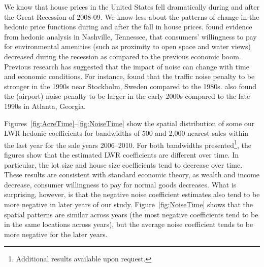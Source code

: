\documentclass{article}\usepackage{graphicx, color}
\begin{document}
We know that house prices in the United States fell dramatically during and after the Great Recession of 2008-09. We know less about the patterns of change in the hedonic price functions during and after the fall in house prices. \citet{Cho2011b} found evidence from hedonic analysis in Nashville, Tennessee, that consumers' willingness to pay for environmental amenities (such as proximity to open space and water views) decreased during the recession as compared to the previous economic boom. Previous research has suggested that the impact of noise can change with time and economic conditions. For instance, \citet{Wilhelmsson2000} found that the traffic noise penalty to be stronger in the 1990s near Stockholm, Sweden compared to the 1980s. \citet{Cohen2009} also found the (airport) noise penalty to be larger in the early 2000s compared to the late 1990s in Atlanta, Georgia. 

Figures~\ref{fig:AcreTime}--\ref{fig:NoiseTime} show the spatial distribution of some our LWR hedonic coefficients for bandwidths of 500 and 2,000 nearest sales within the last year for the sale years 2006--2010. For both bandwidths presented\footnote{Additional results available upon request.}, the figures show that the estimated LWR coefficients are different over time. In particular, the lot size and house size coefficients tend to decrease over time. These results are consistent with standard economic theory, as wealth and income decrease, consumer willingness to pay for normal goods decreases. What is surprising, however, is that the negative noise coefficient estimates also tend to be more negative in later years of our study. Figure~\ref{fig:NoiseTime} shows that the spatial patterns are similar across years (the most negative coefficients tend to be in the same locations across years), but the average noise coefficient tends to be more negative for the later years. 
\end{document}
